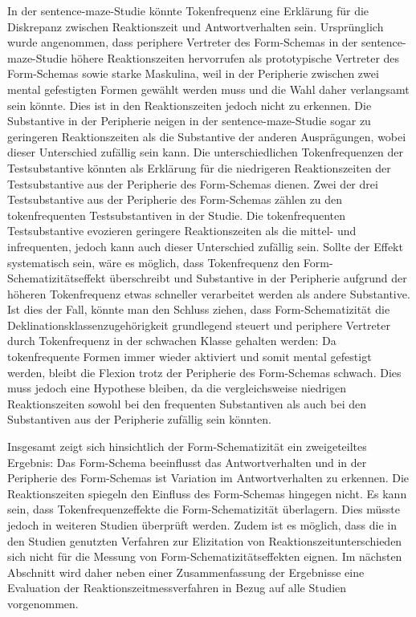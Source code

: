 In der sentence-maze-Studie könnte Tokenfrequenz eine Erklärung für die Diskrepanz zwischen Reaktionszeit und Antwortverhalten sein. Ursprünglich wurde angenommen, dass periphere Vertreter des Form-Schemas in der sentence-maze-Studie höhere Reaktionszeiten hervorrufen als prototypische Vertreter des Form-Schemas sowie starke Maskulina, weil in der Peripherie zwischen zwei mental gefestigten Formen gewählt werden muss und die Wahl daher verlangsamt sein könnte. Dies ist in den Reaktionszeiten jedoch nicht zu erkennen. Die Substantive in der Peripherie neigen in der sentence-maze-Studie sogar zu geringeren Reaktionszeiten als die Substantive der anderen Ausprägungen, wobei dieser Unterschied zufällig sein kann. Die unterschiedlichen Tokenfrequenzen der Testsubstantive könnten als Erklärung für die niedrigeren Reaktionszeiten der Testsubstantive aus der Peripherie des Form-Schemas dienen. Zwei der drei Testsubstantive aus der Peripherie des Form-Schemas zählen zu den tokenfrequenten Testsubstantiven in der Studie. Die tokenfrequenten Testsubstantive evozieren geringere Reaktionszeiten als die mittel- und infrequenten, jedoch kann auch dieser Unterschied zufällig sein. Sollte der Effekt systematisch sein, wäre es möglich, dass Tokenfrequenz den Form-Schematizitätseffekt überschreibt und Substantive in der Peripherie aufgrund der höheren Tokenfrequenz  etwas schneller verarbeitet werden als andere Substantive. Ist dies der Fall, könnte man den Schluss ziehen, dass Form-Schematizität die Deklinationsklassenzugehörigkeit grundlegend steuert und periphere Vertreter durch Tokenfrequenz in der schwachen Klasse gehalten werden: Da tokenfrequente Formen immer wieder aktiviert und somit mental gefestigt werden, bleibt die Flexion trotz der Peripherie des Form-Schemas schwach. Dies muss jedoch eine Hypothese bleiben, da die vergleichsweise niedrigen Reaktionszeiten sowohl bei den frequenten Substantiven als auch bei den Substantiven aus der Peripherie zufällig sein könnten. 

Insgesamt zeigt sich hinsichtlich der Form-Schematizität ein zweigeteiltes Ergebnis: Das Form-Schema beeinflusst das Antwortverhalten und in der Peripherie des Form-Schemas ist Variation im Antwortverhalten zu erkennen. Die Reaktionszeiten spiegeln den Einfluss des Form-Schemas hingegen nicht. Es kann sein, dass Tokenfrequenzeffekte die Form-Schematizität überlagern. Dies müsste jedoch in weiteren Studien überprüft werden. Zudem ist es möglich, dass die in den Studien genutzten Verfahren zur Elizitation von Reaktionszeitunterschieden sich nicht für die Messung von Form-Schematizitätseffekten eignen. Im nächsten Abschnitt wird daher neben einer Zusammenfassung der Ergebnisse eine Evaluation der Reaktionszeitmessverfahren in Bezug auf alle Studien vorgenommen.

